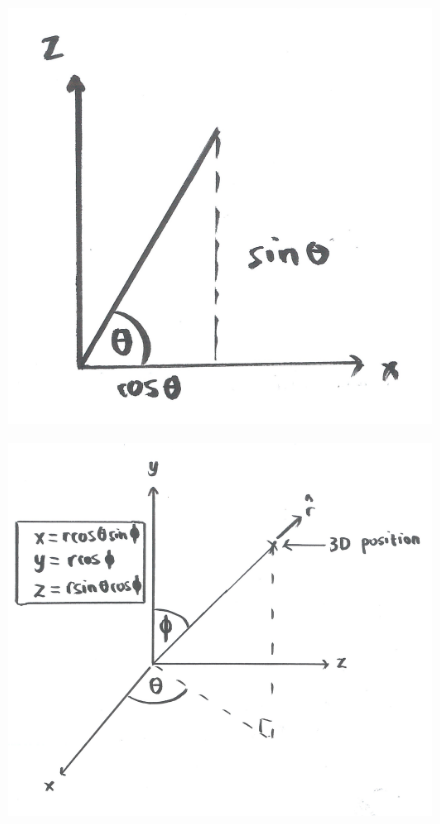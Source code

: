 \documentclass{article}
\begin{document}
\begin{figure}[h!]
\centering
\begin{minipage}{.5\textwidth}
  \centering
  \includegraphics[width=.36\textheight]{Polar.png}
  \label{fig:polar}
\end{minipage}%
\begin{minipage}{.5\textwidth}
  \centering
  \includegraphics[width=.4\textheight]{Spherical.png}
  \label{fig:sph}
\end{minipage}
\end{figure}
\end{document}
